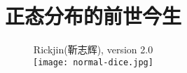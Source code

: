%
\hypersetup{CJKbookmarks=true}
\title{\Huge \youyuan \textbf{正态分布的前世今生}}
\author{\youyuan Rickjin(靳志辉), version 2.0 \\
\texttt{[image: normal-dice.jpg]}
}

\maketitle
\tableofcontents


